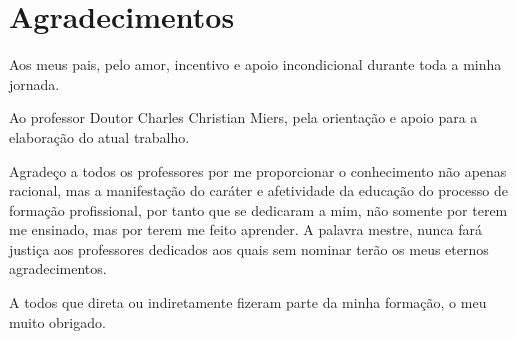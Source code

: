 \section*{Agradecimentos}


Aos meus pais, pelo amor, incentivo e apoio incondicional durante toda a minha jornada.



Ao professor Doutor Charles Christian Miers, pela orientação e apoio para a elaboração do atual trabalho.



Agradeço a todos os professores por me proporcionar o conhecimento não apenas racional, mas a manifestação do caráter e afetividade da educação do processo de formação profissional, por tanto que se dedicaram a mim, não somente por terem me ensinado, mas por terem me feito aprender. A palavra mestre, nunca fará justiça aos professores dedicados aos quais sem nominar terão os meus eternos agradecimentos.



A todos que direta ou indiretamente fizeram parte da minha formação, o meu muito obrigado.